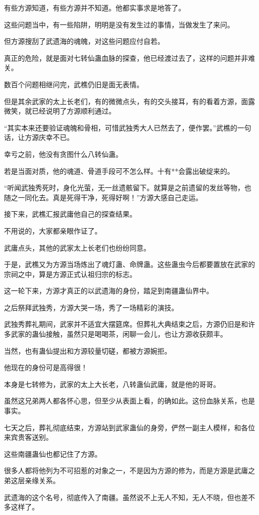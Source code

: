\begin{this_body}
有些方源知道，有些方源并不知道。他都实事求是地答了。

这些问题当中，有一些陷阱，明明是没有发生过的事情，当做发生了来问。

但方源搜刮了武遗海的魂魄，对这些问题应付自若。

真正的危险，就是面对七转仙蛊血脉的探查，他已经渡过去了，这样的问题并非难关。

数百个问题相继问完，武樵仍旧是面无表情。

但是其余武家的太上长老们，有的微微点头，有的交头接耳，有的看着方源，面露微笑，就已经说明了方源顺利通过。

“其实本来还要验证魂魄和骨相，可惜武独秀大人已然去了，便作罢。”武樵的一句话，让方源庆幸不已。

幸亏之前，他没有贪图什么八转仙蛊。

若是当面对质，他的魂道、骨道手段可不怎么样。十有**会露出破绽来的。

“听闻武独秀死时，身化光萤，无一丝遗骸留下。就算是之前遗留的发丝等物，也随之一同化去。真是死得干净，死得好啊！”方源大感自己走运。

接下来，武樵汇报武庸他自己的探查结果。

不用说的，大家都亲眼作证了。

武庸点头，其他的武家太上长老们也纷纷同意。

于是，武樵又为方源当场炼出了魂灯蛊、命牌蛊。这些蛊虫今后都要置放在武家的宗祠之中，算是方源正式认祖归宗的标志。

这一轮下来，方源才真正的以武遗海的身份，踏足到南疆蛊仙界中。

之后祭拜武独秀，方源大哭一场，秀了一场精彩的演技。

武独秀葬礼期间，武家并不适宜大摆筵席。但葬礼大典结束之后，方源仍旧是和许多武家的蛊仙接触，虽然只是喝喝茶，闲聊一会儿，也让方源收获颇丰。

当然，也有蛊仙提出和方源较量切磋，都被方源婉拒。

他现在的身份可是高得很！

本身是七转修为，武家的太上大长老，八转蛊仙武庸，就是他的哥哥。

虽然这兄弟两人都各怀心思，但至少从表面上看，的确如此。这份血脉关系，也是事实。

七天之后，葬礼彻底结束，方源站到武家蛊仙的身旁，俨然一副主人模样，和各位来宾贵客送别。

这些南疆蛊仙也都记住了方源。

很多人都将他列为不可招惹的对象之一，不是因为方源的修为，而是方源是武庸之弟这层亲缘关系。

武遗海的这个名号，彻底传入了南疆。虽然说不上无人不知，无人不晓，但也差不多这样了。


\end{this_body}

